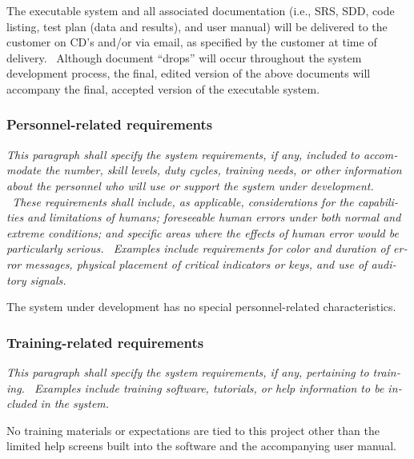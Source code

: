 \documentclass[twoside,letterpaper]{article}
\begin{document}
{\color{black}
The executable system and all associated documentation (i.e., SRS, SDD,
code listing, test plan (data and results), and user manual) will be
delivered to the customer on CD{\textquoteright}s and/or via email, as
specified by the customer at time of delivery. \ Although document
{\textquotedblleft}drops{\textquotedblright} will occur throughout the
system development process, the final, edited version of the above
documents will accompany the final, accepted version of the executable
system.}

\subsubsection[Personnel{}-related
requirements]{\rmfamily\bfseries\color{black}
Personnel-related requirements}
{\color{black}
\foreignlanguage{english}{\textit{This paragraph shall specify the
system requirements, if any, included to accommodate the number, skill
levels, duty cycles, training needs, or other information about the
personnel who will use or support the system under development. \ These
requirements shall include, as applicable, considerations for the
capabilities and limitations of humans; foreseeable human errors under
both normal and extreme conditions; and specific areas where the
effects of human error would be particularly serious. \ Examples
include requirements for color and duration of error messages, physical
placement of critical indicators or keys, and use of auditory
signals.}}\foreignlanguage{english}{ }}

{\color{black}
The system under development has no special personnel-related
characteristics. }

\subsubsection[Training{}-related
requirements]{\rmfamily\bfseries\color{black}
Training-related requirements}
{\color{black}
\foreignlanguage{english}{\textit{This paragraph shall specify the
system requirements, if any, pertaining to training. \ Examples include
training software, tutorials, or help information to be included in the
system.}}\foreignlanguage{english}{ \ \ }}

{\color{black}
No training materials or expectations are tied to this project other
than the limited help screens built into the software and the
accompanying user manual.}
\end{document}
